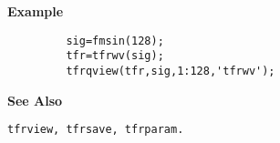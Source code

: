 {\bf \large {}\selectfont Example}
\begin{verbatim}
         sig=fmsin(128); 
         tfr=tfrwv(sig);
         tfrqview(tfr,sig,1:128,'tfrwv');
\end{verbatim}
\vspace*{.5cm}


{\bf \large {}\selectfont See Also}\\
\hspace*{1.5cm}
\begin{minipage}[t]{13.5cm}
\begin{verbatim}
tfrview, tfrsave, tfrparam.
\end{verbatim}
\end{minipage}
